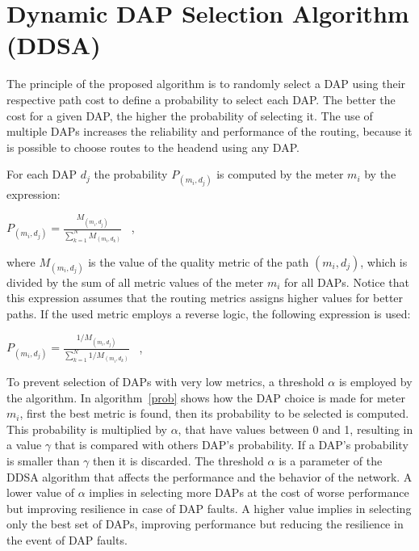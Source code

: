 \documentclass[conference]{IEEEtran}
\begin{document}
\section{Dynamic DAP Selection Algorithm (DDSA)}


The principle of the proposed algorithm is to randomly select a DAP using their respective path cost to define a probability to select each DAP. The better the cost for a given DAP, the higher the probability of selecting it. The use of multiple DAPs increases the reliability and performance of the routing, because it is possible to choose routes to the headend using any DAP.

For each DAP $d_{j}$ the probability $P_{(m_{i},d_{j})}$ is computed by the meter $m_{i}$ by the expression: \begin{center}$ P_{(m_{i},d_{j})} =  \frac {M_{(m_{i},d_{j})}}{\sum\limits_{k=1}^{N} M_{(m_{i},d_{k})}} $  \  , \end{center} where $ {M_{(m_{i},d_{j})}} $ is the value of the quality metric of the path $(m_{i},d_{j})$, which is divided by the sum of all metric values ​​of the meter $ m_ {i} $ for all DAPs.  Notice that this expression assumes that the routing metrics assigns higher values for better paths. If the used metric employs a reverse logic, the following expression is used: \begin{center}$ P_{(m_{i},d_{j})} =  \frac {1/M_{(m_{i},d_{j})}}{\sum\limits_{k=1}^{N} 1/M_{(m_{i},d_{k})}} $  \  , \end{center}

To prevent selection of DAPs with very low metrics, a threshold $\alpha$ is employed by the algorithm. In algorithm~\ref{prob} shows how the DAP choice is made for meter $m_{i}$, first the best metric is found, then its probability to be selected is computed. This probability is multiplied by $\alpha$, that have values between 0 and 1, resulting in a value $\gamma$ that is compared with others DAP's probability. If a DAP's probability is smaller than  $\gamma$ then it is discarded. The threshold $\alpha$ is a parameter of the DDSA algorithm  that affects the performance and the behavior of the network. A lower value of $\alpha$ implies in selecting more DAPs at the cost of worse performance but improving resilience in case of DAP faults. A higher value implies in selecting only the best set of DAPs, improving performance but reducing the resilience in the event of DAP faults. 
\end{document}
